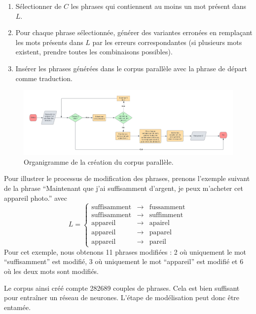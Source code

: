 \begin{enumerate}
    \item Sélectionner de \(C\) les phrases qui contiennent au moins un mot présent dans \(L\).
    \item Pour chaque phrase sélectionnée, générer des variantes erronées en remplaçant les mots présents dans \(L\)
    par les erreurs correspondantes (si plusieurs mots existent, prendre toutes les combinaisons possibles).
    \item Insérer les phrases générées dans le corpus parallèle avec la phrase de départ comme traduction.
\end{enumerate}
\begin{figure}[hbt]
    \begin{center}
        \includegraphics[width=\textwidth]{assets/pdf/flow.pdf}
    \end{center}
    \caption{Organigramme de la création du corpus parallèle.}
    \label{fig:flow-corpus}
\end{figure}
Pour illustrer le processus de modification des phrases, prenons l'exemple suivant de la phrase
``Maintenant que j'ai suffisamment d'argent, je peux m'acheter cet appareil photo.'' avec 
\[
    L = \left\{
        \begin{array}{lcl}
            \text{suffisamment} &\to& \text{fussamment}\\
            \text{suffisamment} &\to& \text{suffimment}\\
            \text{appareil} &\to& \text{apairel}\\
            \text{appareil} &\to& \text{paparel}\\ 
            \text{appareil} &\to& \text{pareil}
        \end{array}
        \right.
\]
Pour cet exemple, nous obtenons 11 phrases modifiées : 
2 où uniquement le mot ``suffisamment'' est modifié, 
3 où uniquement le mot ``appareil'' est modifié et 
6 où les deux mots sont modifiés.


Le corpus ainsi créé compte 282689 couples de phrases.
Cela est bien suffisant pour entraîner un réseau de neurones.
L'étape de modélisation peut donc être entamée.
